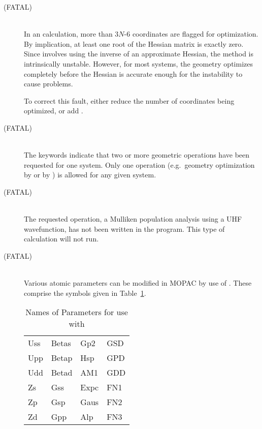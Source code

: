 \begin{description}
\item[ (FATAL)]~\\
In an  calculation, more than 3$N$-6 coordinates are flagged for
optimization.  By implication, at least one root of the Hessian matrix is
exactly zero.  Since  involves using the inverse of an approximate
Hessian, the method is intrinsically unstable.  However, for most systems,
the geometry optimizes completely before the Hessian is accurate enough for
the instability to cause problems.  

To correct this fault, either reduce the number of coordinates being optimized,
or add .

\item[ (FATAL)]~\\
The keywords indicate that two or more geometric operations have been
requested for one system.  Only one operation (e.g.\ geometry optimization by
 or by ) is allowed for any given system.

\item[ (FATAL)]~\\
The requested operation, a Mulliken population analysis using a UHF wavefunction,
has not been written in the program.  This type of calculation will not run.

\item[ (FATAL)]~\\
Various atomic parameters can  be  modified  in  MOPAC  by  use  of 
.  These comprise the symbols given in Table~\ref{expar}.

\begin{table}
\begin{center}
\caption{\label{expar} Names of Parameters for use with }
\begin{tabular}{llll}\\
          Uss    &    Betas    &    Gp2    &     GSD   \\
          Upp    &    Betap    &    Hsp    &     GPD   \\
          Udd    &    Betad    &    AM1    &     GDD   \\
          Zs     &    Gss      &    Expc   &     FN1   \\
          Zp     &    Gsp      &    Gaus   &     FN2   \\
          Zd     &    Gpp      &    Alp    &     FN3   \\
\end{tabular}
\end{center}
\end{table}
         

\end{description}
